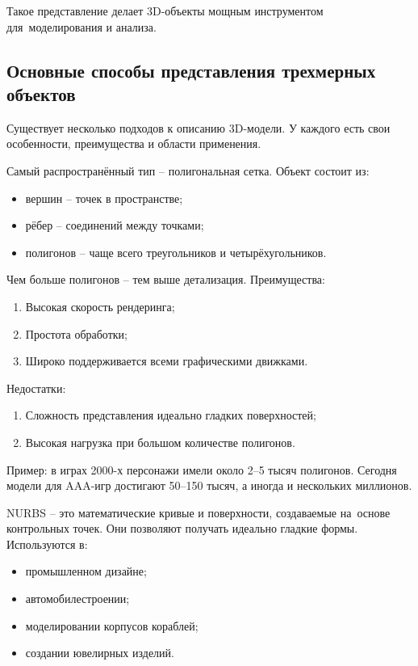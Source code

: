 \documentclass{ou}
\begin{document}
Такое представление делает 3D-объекты мощным инструментом для~моделирования и анализа.
\subsection{Основные способы представления трехмерных объектов}
Существует несколько подходов к описанию 3D-модели. У каждого есть свои особенности, преимущества и области применения.

Самый распространённый тип -- полигональная сетка. Объект состоит из:
\begin{itemize}[label=-, leftmargin=0em, itemindent=3.35em, nosep]
\item вершин -- точек в пространстве;
\item рёбер -- соединений между точками;
\item полигонов -- чаще всего треугольников и четырёхугольников.
\end{itemize}

Чем больше полигонов -- тем выше детализация. Преимущества:
\begin{enumerate}[leftmargin=0em, itemindent=3.75em, nosep, label=\arabic*)]
\item Высокая скорость рендеринга;
\item Простота обработки;
\item Широко поддерживается всеми графическими движками.
\end{enumerate}

Недостатки:
\begin{enumerate}[leftmargin=0em, itemindent=3.75em, nosep, label=\arabic*)]
\item Сложность представления идеально гладких поверхностей;
\item Высокая нагрузка при большом количестве полигонов.
\end{enumerate}

Пример: в играх 2000-х персонажи имели около 2--5 тысяч полигонов. Сегодня модели для AAA-игр достигают 50--150 тысяч, а иногда и нескольких миллионов.

NURBS -- это математические кривые и поверхности, создаваемые на~основе контрольных точек. Они позволяют получать идеально гладкие формы. Используются в:
\begin{itemize}[label=-, leftmargin=0em, itemindent=3.35em, nosep]
\item промышленном дизайне;
\item автомобилестроении;
\item моделировании корпусов кораблей;
\item создании ювелирных изделий.
\end{itemize}
\end{document}

